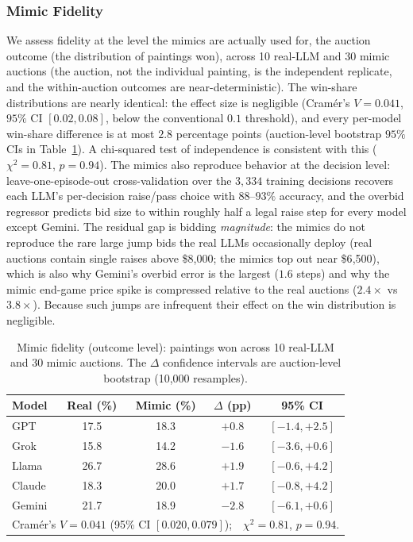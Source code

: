 \subsubsection{Mimic Fidelity}
\label{sec:fidelity-results}
We assess fidelity at the level the mimics are actually used for, the auction outcome (the distribution of paintings won), across 10 real-LLM and 30 mimic auctions (the auction, not the individual painting, is the independent replicate, and the within-auction outcomes are near-deterministic). The win-share distributions are nearly identical: the effect size is negligible (Cram\'er's $V = 0.041$, $95\%$ CI $[0.02, 0.08]$, below the conventional $0.1$ threshold), and every per-model win-share difference is at most $2.8$ percentage points (auction-level bootstrap $95\%$ CIs in Table~\ref{tab:mimic_fidelity}). A chi-squared test of independence is consistent with this ($\chi^2 = 0.81$, $p = 0.94$). The mimics also reproduce behavior at the decision level: leave-one-episode-out cross-validation over the $3{,}334$ training decisions recovers each LLM's per-decision raise/pass choice with $88$--$93\%$ accuracy, and the overbid regressor predicts bid size to within roughly half a legal raise step for every model except Gemini. The residual gap is bidding \emph{magnitude}: the mimics do not reproduce the rare large jump bids the real LLMs occasionally deploy (real auctions contain single raises above \$8{,}000; the mimics top out near \$6{,}500), which is also why Gemini's overbid error is the largest ($1.6$ steps) and why the mimic end-game price spike is compressed relative to the real auctions ($2.4\times$ vs $3.8\times$). Because such jumps are infrequent their effect on the win distribution is negligible.

\begin{table}[htbp]
\caption{Mimic fidelity (outcome level): paintings won across 10 real-LLM and 30 mimic auctions. The $\Delta$ confidence intervals are auction-level bootstrap (10{,}000 resamples).}
\label{tab:mimic_fidelity}
\centering
\begin{tabular}{lcccc}
\hline
Model & Real (\%) & Mimic (\%) & $\Delta$ (pp) & 95\% CI \\
\hline
GPT & 17.5 & 18.3 & $+0.8$ & $[-1.4, +2.5]$ \\
Grok    & 15.8 & 14.2 & $-1.6$ & $[-3.6, +0.6]$ \\
Llama   & 26.7 & 28.6 & $+1.9$ & $[-0.6, +4.2]$ \\
Claude  & 18.3 & 20.0 & $+1.7$ & $[-0.8, +4.2]$ \\
Gemini  & 21.7 & 18.9 & $-2.8$ & $[-6.1, +0.6]$ \\
\hline
\multicolumn{5}{l}{Cram\'er's $V = 0.041$ (95\% CI $[0.020, 0.079]$);\ \ $\chi^2 = 0.81$, $p = 0.94$.} \\
\hline
\end{tabular}
\end{table}

